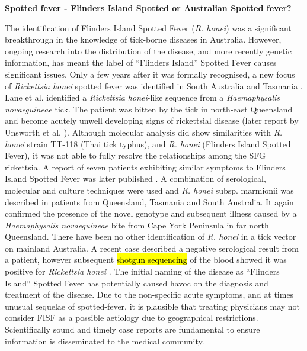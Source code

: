 \documentclass[a4paper, nobind]{templates/ociamthesis}
\begin{document}
\textbf{Spotted fever - Flinders Island Spotted or Australian Spotted fever?}

The identification of Flinders Island Spotted Fever (\emph{R. honei}) was a significant breakthrough in the knowledge of tick-borne diseases in Australia.
However, ongoing research into the distribution of the disease, and more recently genetic information, has meant the label of ``Flinders Island'' Spotted Fever causes significant issues.
Only a few years after it was formally recognised, a new focus of \emph{Rickettsia honei} spotted fever was identified in South Australia and Tasmania \autocite{dyerNewFocusRickettsia2005,unsworthNotOnlyFlinders2005}.
Lane et al. \autocite*{laneEvidenceSpottedFeverlike2005a} identified a \emph{Rickettsia honei}-like sequence from a \emph{Haemaphysalis novaeguineae} tick.
The patient was bitten by the tick in north-east Queensland and become acutely unwell developing signs of rickettsial disease (later report by Unsworth et al. \autocite*{unsworthThreeRickettsiosesDarnley2007}).
Although molecular analysis did show similarities with \emph{R. honei} strain TT-118 (Thai tick typhus), and \emph{R. honei} (Flinders Island Spotted Fever), it was not able to fully resolve the relationships among the SFG rickettsia.
A report of seven patients exhibiting similar symptoms to Flinders Island Spotted Fever was later published \autocite{unsworthThreeRickettsiosesDarnley2007}.
A combination of serological, molecular and culture techniques were used and \emph{R. honei} subsp. marmionii was described in patients from Queensland, Tasmania and South Australia.
It again confirmed the presence of the novel genotype and subsequent illness caused by a \emph{Haemaphysalis novaeguineae} bite from Cape York Peninsula in far north Queensland.
There have been no other identification of \emph{R. honei} in a tick vector on mainland Australia.
A recent case described a negative serological result from a patient, however subsequent \hl{shotgun sequencing} of the blood showed it was positive for \emph{Rickettsia honei} \autocite{grahamDetectionSpottedFever2017}.
The initial naming of the disease as ``Flinders Island'' Spotted Fever has potentially caused havoc on the diagnosis and treatment of the disease.
Due to the non-specific acute symptoms, and at times unusual sequelae of spotted-fever, it is plausible that treating physicians may not consider FISF as a possible aetiology due to geographical restrictions.
Scientifically sound and timely case reports are fundamental to ensure information is disseminated to the medical community.
\end{document}
